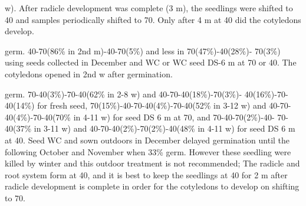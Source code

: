 \begin{description}
w). After radicle development was complete (3 m), the seedlings were shifted to 40
and samples periodically shifted to 70. Only after 4 m at 40 did the cotyledons
develop.
\item[V. lantana] germ. 40-70(86\% in 2nd m)-40-70(5\%) and less in 70(47\%)-40(28\%)-
70(3\%) using seeds collected in December and WC or WC seed DS-6 m at 70 or 40.
The cotyledons opened in 2nd w after germination.
\item[V. opulis] germ. 70-40(3\%)-70-40(62\% in 2-8 w) and 40-70-40(18\%)-70(3\%)-
40(16\%)-70-40(14\%) for fresh seed, 70(15\%)-40-70-40(4\%)-70-40(52\% in 3-12 w)
and 40-70-40(4\%)-70-40(70\% in 4-11 w) for seed DS 6 m at 70, and 70-40-70(2\%)-40-
70-40(37\% in 3-11 w) and 40-70-40(2\%)-70(2\%)-40(48\% in 4-11 w) for seed DS 6 m
at 40. Seed WC and sown outdoors in December delayed germination until the
following October and November when 33\% germ. However these seedling were
killed by winter and this outdoor treatment is not recommended; The radicle and root
system form at 40, and it is best to keep the seedlings at 40 for 2 m after radicle
development is complete in order for the cotyledons to develop on shifting to 70.


\end{description}
